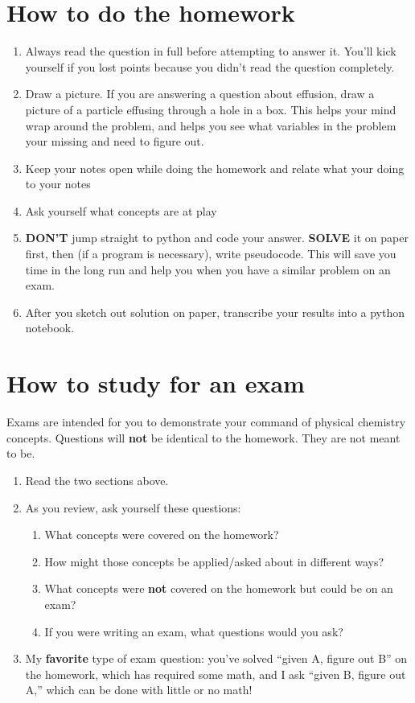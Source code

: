 \documentclass[11pt]{article}
\begin{document}
\section{How to do the homework}
\label{sec:orga362081}
\begin{enumerate}
\item Always read the question in full before attempting to answer it. You'll kick yourself if you lost     
points because you didn't read the question completely.
\item Draw a picture. If you are answering a question about effusion, draw a picture of a particle effusing    
through a hole in a box. This helps your mind wrap around the problem, and helps you see what variables  
in the problem your missing and need to figure out.
\item Keep your notes open while doing the homework and relate what your doing to your notes
\item Ask yourself what concepts are at play
\item \textbf{DON'T} jump straight to python and code your answer. \textbf{SOLVE} it on paper first, then (if a program is necessary), write pseudocode. This
will save you time in the long run and help you when you have a similar problem on an exam.
\item After you sketch out solution on paper, transcribe your results into a python notebook.
\end{enumerate}


\section{How to study for an exam}
\label{sec:org33f1f8e}
Exams are intended for you to demonstrate your command of physical chemistry concepts. Questions will \textbf{not} be identical to the homework. They are not meant to be.

\begin{enumerate}
\item Read the two sections above.
\item As you review, ask yourself these questions: 
\begin{enumerate}
\item What concepts were covered on the homework?
\item How might those concepts be applied/asked about in different ways?
\item What concepts were \textbf{not} covered on the homework but could be on an exam?
\item If you were writing an exam, what questions would you ask?
\end{enumerate}
\item My \textbf{favorite} type of exam question: you've solved ``given A, figure out B'' on the homework, which has required some math, and I ask ``given B, figure out A,'' which can be done with little or no math!
\end{enumerate}
\end{document}
